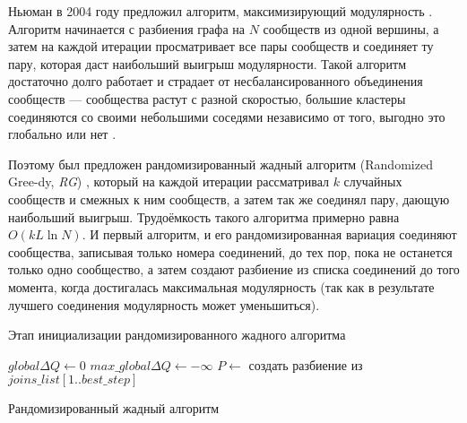 Ньюман в 2004 году предложил алгоритм, максимизирующий модулярность \cite{Newman:2004}. Алгоритм начинается с разбиения графа на $N$ сообществ из одной вершины, а затем на каждой итерации просматривает все пары сообществ и соединяет ту пару, которая даст наибольший выигрыш модулярности. Такой алгоритм достаточно долго работает и страдает от несбалансированного объединения сообществ --- сообщества растут с разной скоростью, большие кластеры соединяются со своими небольшими соседями независимо от того, выгодно это глобально или нет \cite{Ovelgoenne&Geyer-Schulz:2012a}.

Поэтому был предложен рандомизированный жадный алгоритм (Randomized Gree-dy, \emph{RG}) \cite{Ovelgoenne&Geyer-Schulz:2010}, который на каждой итерации рассматривал $k$ случайных сообществ и смежных к ним сообществ, а затем так же соединял пару, дающую наибольший выигрыш. Трудоёмкость такого алгоритма примерно равна $O(kL \ln N)$. И первый алгоритм, и его рандомизированная вариация соединяют сообщества, записывая только номера соединений, до тех пор, пока не останется только одно сообщество, а затем создают разбиение из списка соединений до того момента, когда достигалась максимальная модулярность (так как в результате лучшего соединения модулярность может уменьшиться). 
\begin{algorithm}[h]
\SetAlgoLined
{}
\BlankLine
\caption{Этап инициализации рандомизированного жадного алгоритма}
\label{alg:RG-init}
\end{algorithm}

\begin{algorithm}[H]
$global\Delta Q \leftarrow 0$\;
$max\_global\Delta Q \leftarrow -\infty$\;
\BlankLine
$P \leftarrow $ создать разбиение из $joins\_list[1..best\_step]$\;
\BlankLine
\caption{Рандомизированный жадный алгоритм}
\label{alg:RG}
\end{algorithm}

